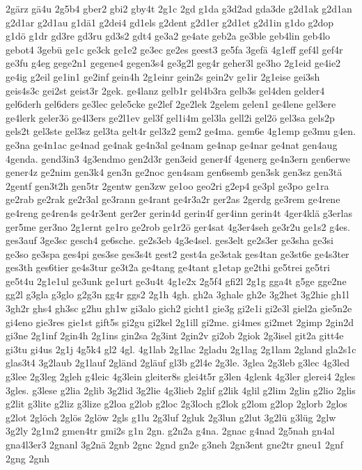 {2gärz
gä4u
2g5b4
gber2
gbi2
gby4t
2g1c
2gd
g1da
g3d2ad
gda3de
g2d1ak
g2d1an
g2d1ar
g2d1au
g1dä1
g2dei4
gd1els
g2dent
g2d1er
g2d1et
g2d1in
g1do
g2dop
g1dö
g1dr
gd3re
gd3ru
gd3s2
gdt4
ge3a2
ge4ate
geb2a
ge3ble
geb4lin
geb4lo
gebot4
3gebü
ge1c
ge3ck
ge1e2
ge3ec
ge2es
geest3
ge5fa
3gefä
4g1eff
gef4l
gef4r
ge3fu
g4eg
gege2n1
gegene4
gegen3s4
ge3g2l
geg4r
geher3l
ge3ho
2g1eid
ge4ie2
ge4ig
g2eil
ge1in1
ge2inf
gein4h
2g1einr
gein2s
gein2v
ge1ir
2g1eise
gei3sh
geis4s3c
gei2st
geist3r
2gek.
ge4lanz
gelb1r
gel4b3ra
gelb3s
gel4den
gelder4
gel6derh
gel6ders
ge3lec
gele5cke
ge2lef
2ge2lek
2gelem
gelen1
ge4lene
gel3ere
ge4lerk
geler3ö
ge4l3ers
ge2l1ev
gel3f
gel1i4m
gel3la
gell2i
gel2ö
gel3sa
gels2p
gels2t
gel3ste
gel3sz
gel3ta
gelt4r
gel3z2
gem2
ge4ma.
gem6e
4g1emp
ge3mu
g4en.
ge3na
ge4n1ac
ge4nad
ge4nak
ge4n3al
ge4nam
ge4nap
ge4nar
ge4nat
gen4aug
4genda.
gend3in3
4g3endmo
gen2d3r
gen3eid
gener4f
4generg
ge4n3ern
gen6erwe
gener4z
ge2nim
gen3k4
gen3n
ge2noc
gen4sam
gen6semb
gen3sk
gen3sz
gen3tä
2gentf
gen3t2h
gen5tr
2gentw
gen3zw
ge1oo
geo2ri
g2ep4
ge3pl
ge3po
ge1ra
ge2rab
ge2rak
ge2r3al
ge3rann
ge4rant
ge4r3a2r
ger2as
2gerdg
ge3rem
ge4rene
ge4reng
ge4ren4s
ge4r3ent
ger2er
gerin4d
gerin4f
ger4inn
gerin4t
4ger4klä
g3erlas
ger5me
ger3no
2g1ernt
ge1ro
ge2rob
ge1r2ö
ger4sat
4g3er4seh
ge3r2u
ge1s2
g4es.
ges3auf
3ge3sc
gesch4
ge6sche.
ge2s3eb
4g3e4sel.
ges3elt
ge2s3er
ge3sha
ge3si
ge3so
ge3spa
ges4pi
ges3se
ges3s4t
gest2
gest4a
ge3stak
ges4tan
ge3st6e
ge4s3ter
ges3th
ges6tier
ge4s3tur
ge3t2a
ge4tang
ge4tant
g1etap
ge2thi
ge5trei
ge5tri
ge5t4u
2g1e1ul
ge3unk
ge1urt
ge3u4t
4g1e2x
2g5f4
gfi2l
2g1g
gga4t
g5ge
gge2ne
gg2l
g3gla
g3glo
g2g3n
gg4r
ggs2
2g1h
4gh.
gh2a
3ghale
gh2e
3g2het
3g2hie
gh1l
3gh2r
ghs4
gh3sc
g2hu
gh1w
gi3alo
gich2
gicht1
gie3g
gi2e1i
gi2e3l
giel2a
gie5n2e
gi4eno
gie3res
gie1st
gift5s
gi2gu
gi2kel
2g1ill
gi2me.
gi4mes
gi2met
2gimp
2gin2d
gi3ne
2g1inf
2gin4h
2g1ins
gin2sa
2g3int
2gin2v
gi2ob
2giok
2g3isel
git2a
gitt4e
gi3tu
gi4us
2g1j
4g5k4
gl2
4gl.
4g1lab
2g1lac
2gladu
2g1lag
2g1lam
2gland
gla2s1c
glas3t4
3g2laub
2g1lauf
2gländ
2gläuf
gl3b
g2l4e
2g3le.
3glea
2g3leb
g3lec
4g3led
g3lee
2g3leg
2gleh
g4leic
4g3lein
gleiter8s
glei4t5r
g3len
4glenk
4g3ler
glerei4
2gles
3gles.
g3lese
g2lia
2glib
3g2lid
3g2lie
4g3lieb
2glif
g2lik
4glil
g2lim
2glin
g2lio
2glis
g2lit
g3lite
g2liz
g3lize
g2loa
g2lob
g2loc
2g3loch
g2lok
g2lom
g2lop
2glorb
2glos
g2lot
2glöch
2glös
2glöw
2gls
g1lu
2g3luf
2gluk
2g3lun
g2lut
3g2lü
g3lüg
2glw
3g2ly
2g1m2
gmen4tr
gmi2s
g1n
2gn.
g2n2a
g4na.
2gnac
g4nad
2g5nah
gn4al
gna4l3er3
2gnanl
3g2nä
2gnb
2gnc
2gnd
gn2e
g3neh
2gn3ent
gne2tr
gneu1
2gnf
2gng
2gnh
}
